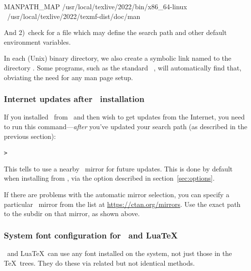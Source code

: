 \documentclass{article}
\begin{document}
\begin{sverbatim}
MANPATH_MAP /usr/local/texlive/2022/bin/x86_64-linux \
            /usr/local/texlive/2022/texmf-dist/doc/man
\end{sverbatim}

And 2)~check for a file  which may define the
search path and other default environment variables.

In each (Unix) binary directory, we also create a symbolic link named
 to the directory \dirname{texmf-dist/doc/man}.  Some 
programs, such as the standard \MacOSX\ \code{man}, will automatically
find that, obviating the need for any man page setup.


\subsubsection{Internet updates after \DVD\ installation}
\label{sec:dvd-install-net-updates}

If you installed \TL\ from \DVD\ and then wish to get updates from the
Internet, you need to run this command---\emph{after} you've updated
your search path (as described in the previous section):

\begin{alltt}
> 
\end{alltt}

This tells  to use a nearby \CTAN\ mirror for future updates.
This is done by default when installing from \DVD, via the option
described in section~\ref{sec:options}.

If there are problems with the automatic mirror selection, you can
specify a particular \CTAN\ mirror from the list at
\url{https://ctan.org/mirrors}.  Use the exact path to the
 subdir on that mirror, as shown above.


\subsubsection{System font configuration for \protect\XeTeX\protect\ and Lua\protect\TeX}
\label{sec:font-conf-sys}

\XeTeX\ and Lua\TeX\ can use any font installed on the system, not just
those in the \TeX\ trees.  They do these via related but not identical
methods.
\end{document}
